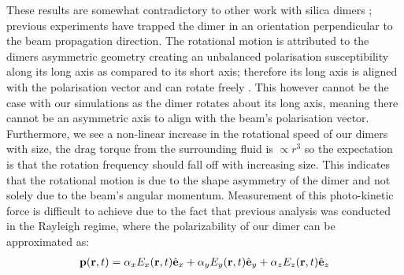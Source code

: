 These results are somewhat contradictory to other work with silica dimers
\cite{Ahn2018, Debuysschere2023,Reimann2018}; previous experiments
have trapped the dimer in an orientation perpendicular to the beam
propagation direction. The rotational motion is attributed to the
dimers asymmetric geometry creating an unbalanced polarisation susceptibility
along its long axis as compared to its short axis; therefore its long
axis is aligned with the polarisation vector and can rotate
freely \cite{Ahn2018}. This however cannot be the case with our
simulations as the dimer rotates about its long axis, meaning there
cannot be an asymmetric axis to align with the beam's polarisation
vector. Furthermore, we see a non-linear increase in the rotational
speed of our dimers with size, the drag torque from the surrounding
fluid is $\propto r^3$ so the expectation is that the rotation
frequency should fall off with increasing size.  This indicates that
the rotational motion is due to the shape asymmetry of the dimer and
not solely due to the beam's angular momentum.  Measurement of this
photo-kinetic force is difficult to achieve due to the fact that
previous analysis was conducted in the Rayleigh regime, where the
polarizability of our dimer can be approximated as:
\begin{align}
  \bold{p}({\bf r},t)
  =
  \alpha_x E_x({\bf r},t)\hat{\bf e}_x
  + \alpha_yE_y({\bf r},t)\hat{\bf e}_y
  + \alpha_zE_z({\bf r},t)\hat{\bf e}_z
\end{align}

